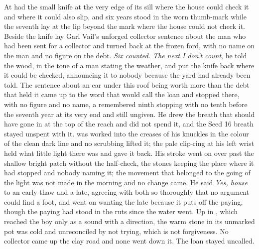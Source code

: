 At   had the small knife at the very edge of its sill where the house could check it and where it could also slip, and six years stood in the worn thumb-mark while the seventh lay at the lip beyond the mark where the house could not check it. Beside the knife lay Garl Vail's unforged collector sentence about the man who had been sent for a collector and turned back at the frozen ford, with no name on the man and no figure on the debt. \emph{Six counted. The next I don't count}, he told the wood, in the tone of a man stating the weather, and put the knife back where it could be checked, announcing it to nobody because the yard had already been told. The sentence about an ear under this roof being worth more than the debt that held it came up to the word that would call the loan and stopped there, with no figure and no name, a remembered ninth stopping with no tenth before the seventh year at its very end and still ungiven. He drew the breath that should have gone in at the top of the reach and did not spend it, and the Seed 16 breath stayed unspent with it.  was worked into the creases of his knuckles in the colour of the clean dark line and no scrubbing lifted it; the pale clip-ring at his left wrist held what little light there was and gave it back. His stroke went on over  past the shallow bright patch without the half-check, the stones keeping the place where it had stopped and nobody naming it; the movement that belonged to the going of the light was not made in the morning and no change came. He said \emph{Yes, house} to an early thaw and a late, agreeing with both so thoroughly that no argument could find a foot, and went on wanting the late because it puts off the paying, though the paying had stood in the ruts since the water went. Up in , which reached the boy only as a sound with a direction, the warm stone in its unmarked pot was cold and unreconciled by not trying, which is not forgiveness. No collector came up the clay road and none went down it. The loan stayed uncalled.

